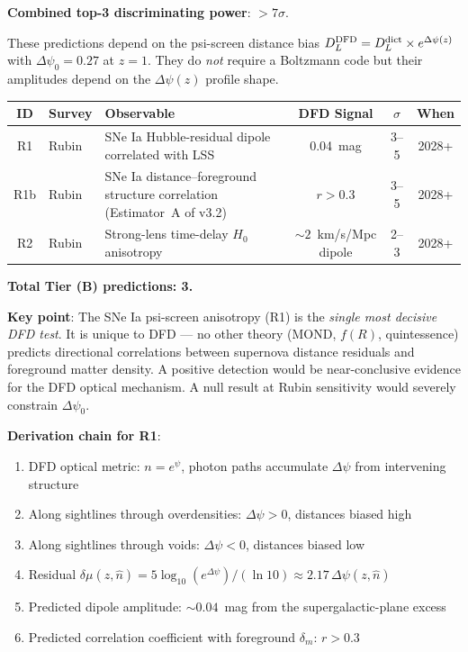 \documentclass[11pt,a4paper]{article}
\newcommand{\Dpsi}{\Delta\psi}
\begin{document}
\begin{granitebox}
\textbf{Combined top-3 discriminating power}: $> 7\sigma$.

\end{granitebox}



\begin{distbox}

These predictions depend on the psi-screen distance bias
$D_L^{\rm DFD} = D_L^{\rm dict} \times e^{\Dpsi(z)}$ with
$\Dpsi_0 = 0.27$ at $z = 1$. They do \emph{not} require a Boltzmann
code but their amplitudes depend on the $\Dpsi(z)$ profile shape.

\begin{center}
\begin{tabular}{clp{4.5cm}ccc}
\toprule
\textbf{ID} & \textbf{Survey} & \textbf{Observable}
& \textbf{DFD Signal} & \textbf{$\sigma$} & \textbf{When} \\
\midrule

R1 & Rubin &
SNe Ia Hubble-residual dipole correlated with LSS
& 0.04~mag & 3--5 & 2028+ \\[3pt]

R1b & Rubin &
SNe Ia distance--foreground structure correlation
(Estimator~A of v3.2)
& $r > 0.3$ & 3--5 & 2028+ \\[3pt]

R2 & Rubin &
Strong-lens time-delay $H_0$ anisotropy
& $\sim 2$~km/s/Mpc dipole & 2--3 & 2028+ \\

\bottomrule
\end{tabular}
\end{center}

\textbf{Total Tier (B) predictions: 3.}

\textbf{Key point}: The SNe Ia psi-screen anisotropy (R1) is the
\emph{single most decisive DFD test}. It is unique to DFD ---
no other theory (MOND, $f(R)$, quintessence) predicts
directional correlations between supernova distance residuals and
foreground matter density. A positive detection would be
near-conclusive evidence for the DFD optical mechanism. A null
result at Rubin sensitivity would severely constrain $\Dpsi_0$.

\textbf{Derivation chain for R1}:
\begin{enumerate}[nosep]
\item DFD optical metric: $n = e^\psi$, photon paths accumulate
  $\Dpsi$ from intervening structure
\item Along sightlines through overdensities: $\Dpsi > 0$, distances
  biased high
\item Along sightlines through voids: $\Dpsi < 0$, distances biased low
\item Residual $\delta\mu(z,\hat{n}) = 5\log_{10}(e^{\Dpsi})/({\ln 10})
  \approx 2.17\,\Dpsi(z,\hat{n})$
\item Predicted dipole amplitude: $\sim 0.04$~mag from the
  supergalactic-plane excess
\item Predicted correlation coefficient with foreground $\delta_m$:
  $r > 0.3$
\end{enumerate}


\end{distbox}
\end{document}
